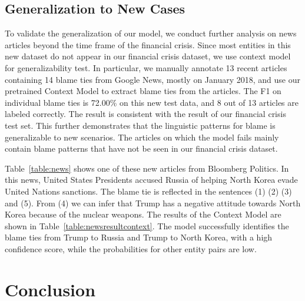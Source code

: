 \documentclass[letterpaper]{article} %
\begin{document}
\subsection{Generalization to New Cases}

To validate the generalization of our model, we conduct further analysis on news articles beyond the time frame of the financial crisis. Since most entities in this new dataset do not appear in our financial crisis dataset, we use context model for generalizability test. In particular, we manually annotate 13 recent articles containing 14 blame ties from Google News, mostly on January 2018, and use our pretrained Context Model to extract blame ties from the articles. The F1 on individual blame ties is 72.00\% on this new test data, and 8 out of 13 articles are labeled correctly. The result is consistent with the result of our financial crisis test set. This further demonstrates that the linguistic patterns for blame is generalizable to new scenarios. The articles on which the model fails mainly contain blame patterns that have not be seen in our financial crisis dataset.

Table~\ref{table:news} shows one of these new articles from Bloomberg Politics. In this news, United States Presidents accused Russia of helping North Korea evade United Nations sanctions. The blame tie is reflected in the sentences (1) (2) (3) and (5). From (4) we can infer that Trump has a negative attitude towards North Korea because of the nuclear weapons. The results of the Context Model are shown in Table~\ref{table:newsresultcontext}. The model successfully identifies the blame ties from Trump to Russia and Trump to North Korea, with a high confidence score, while the probabilities for other entity pairs are low.

\section{Conclusion}
\end{document}
